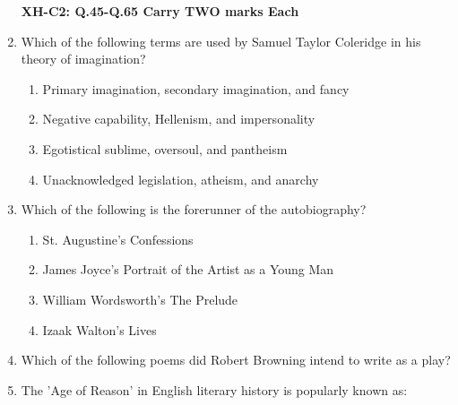 \documentclass[12pt]{article}
\theoremstyle{remark}
\begin{document}
\begin{enumerate}
\hfill{}
\newpage
\textbf{XH-C2: Q.45-Q.65 Carry TWO marks Each} 
\item Which of the following terms are used by Samuel Taylor Coleridge in his theory
of imagination? 
\begin{enumerate} 
\item Primary imagination, secondary imagination, and fancy 
\item Negative capability, Hellenism, and impersonality 
\item Egotistical sublime, oversoul, and pantheism 
\item Unacknowledged legislation, atheism, and anarchy 
\end{enumerate}
\hfill{}
\item Which of the following is the forerunner of the autobiography? 
\begin{enumerate} 
\item St. Augustine's Confessions 
\item James Joyce's Portrait of the Artist as a Young Man 
\item William Wordsworth's The Prelude 
\item Izaak Walton's Lives 
\end{enumerate}
\hfill{}
\item Which of the following poems did Robert Browning intend to write as a play? 
\begin{enumerate}  \end{enumerate}
\hfill{}
\item The 'Age of Reason' in English literary history is popularly known as: 
\begin{enumerate}  \end{enumerate}

\end{enumerate}
\end{document}
